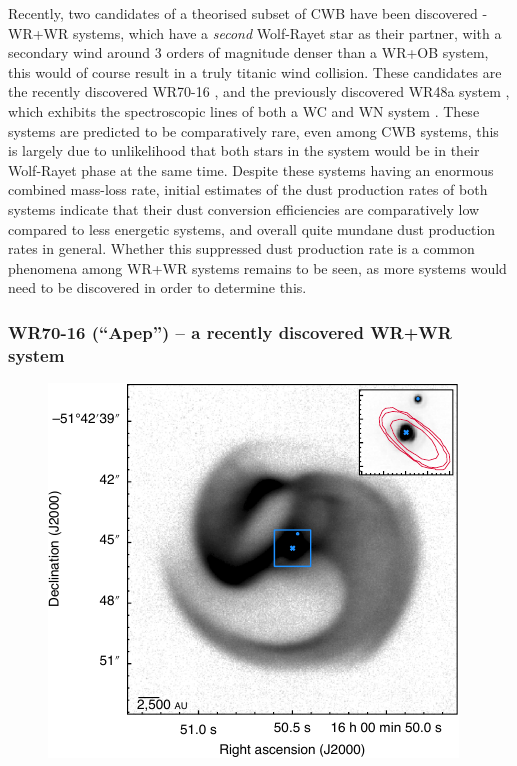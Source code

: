 Recently, two candidates of a theorised subset of CWB have been discovered - WR+WR systems, which have a \textit{second} Wolf-Rayet star as their partner, with a secondary wind around 3 orders of magnitude denser than a WR+OB system, this would of course result in a truly titanic wind collision.
These candidates are the recently discovered WR70-16 \parencite{callinghamAnisotropicWindsWolf2019}, and the previously discovered WR48a system \parencite{danksInfraredSpectroscopyInfrared1983}, which exhibits the spectroscopic lines of both a WC and WN system \parencite{williamsVariableDustEmission2019}.
These systems are predicted to be comparatively rare, even among CWB systems, this is largely due to unlikelihood that both stars in the system would be in their Wolf-Rayet phase at the same time.
Despite these systems having an enormous combined mass-loss rate, initial estimates of the dust production rates of both systems indicate that their dust conversion efficiencies are comparatively low compared to less energetic systems, and overall quite mundane dust production rates in general.
Whether this suppressed dust production rate is a common phenomena among WR+WR systems remains to be seen, as more systems would need to be discovered in order to determine this.

\subsubsection{WR70-16 (``Apep'') -- a recently discovered WR+WR system}

\begin{figure}
  \centering
  \includegraphics[]{assets/systems/apep-callingham-2019.pdf}
  \caption[\textit{VLT image of Apep \parencite{callinghamAnisotropicWindsWolf2019}}]{\textcite{callinghamAnisotropicWindsWolf2019}}
  \label{fig:apep-callingham}
\end{figure}

